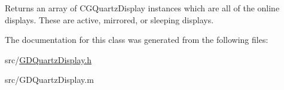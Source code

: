 Returns an array of CGQuartzDisplay instances which are all of the online displays. These are active, mirrored, or sleeping displays. 

The documentation for this class was generated from the following files:\begin{DoxyCompactItemize}
\item 
src/\hyperlink{_g_d_quartz_display_8h}{GDQuartzDisplay.h}\item 
src/GDQuartzDisplay.m\end{DoxyCompactItemize}
